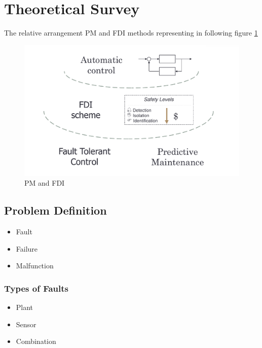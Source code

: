 \documentclass[class=article, crop=false]{standalone}
\begin{document}
\tableofcontents

% 
\section{Theoretical Survey}
The relative arrangement PM and FDI methods representing in following
figure \ref{fig:fdi_pm}
\begin{figure}[h!]
    \centering
    \includegraphics[scale=0.3]{FDI_PM.png}
    \caption{PM and FDI }
    \label{fig:fdi_pm}
\end{figure}

% 

\subsection{Problem Definition}
\begin{itemize}
    \item Fault
    \item Failure   
    \item Malfunction
\end{itemize}

\subsubsection{Types of Faults}
\begin{itemize}
    \item Plant
    \item Sensor
    \item Combination
\end{itemize}
\end{document}
